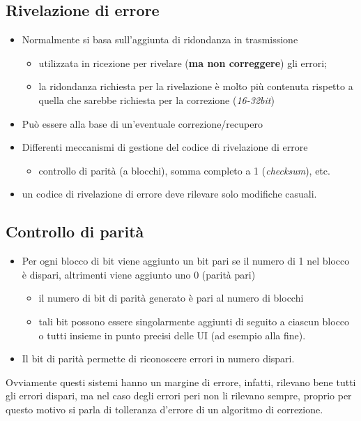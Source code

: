 \documentclass{book}
\begin{document}
\subsection{Rivelazione di errore}
\begin{itemize}
	\item Normalmente si basa sull'aggiunta di ridondanza in trasmissione
		\begin{itemize}
			\item utilizzata in ricezione per rivelare ({\bf ma non correggere})
				gli errori;
			\item la ridondanza richiesta per la rivelazione è molto più
				contenuta rispetto a quella che sarebbe richiesta per la
				correzione (\textit{16-32bit})
		\end{itemize}
	\item Può essere alla base di un'eventuale correzione/recupero
	\item Differenti meccanismi di gestione del codice di rivelazione di errore
		\begin{itemize}
			\item controllo di parità (a blocchi), somma completo a 1
				(\textit{checksum}), etc.
		\end{itemize}
	\item un codice di rivelazione di errore deve rilevare solo modifiche
		casuali.
\end{itemize}
\subsection{Controllo di parità}
\begin{itemize}
	\item Per ogni blocco di bit viene aggiunto un bit pari se il numero di 1
		nel blocco è dispari, altrimenti viene aggiunto uno 0 (parità pari)
		\begin{itemize}
			\item il numero di bit di parità generato è pari al numero di
				blocchi
			\item tali bit possono essere singolarmente aggiunti di seguito a
				ciascun blocco o tutti insieme in punto precisi delle UI (ad
				esempio alla fine).
		\end{itemize}
	\item Il bit di parità permette di riconoscere errori in numero dispari.
\end{itemize}
Ovviamente questi sistemi hanno un margine di errore, infatti, rilevano bene
tutti gli errori dispari, ma nel caso degli errori peri non li rilevano sempre,
proprio per questo motivo si parla di tolleranza d'errore di un algoritmo di
correzione.
\end{document}
